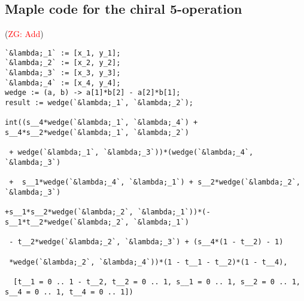 \documentclass[11pt]{amsart}
\theoremstyle{definition}
\theoremstyle{remark}
\numberwithin{equation}{section}
\newcommand{\Gui}[1]{(\textcolor{red}{ZG: #1})}
\begin{document}
\subsection{Maple code for the chiral 5-operation}

\Gui{Add}
\iffalse
\begin{lstlisting}
`&lambda;_1` := [x_1, y_1];
`&lambda;_2` := [x_2, y_2];
`&lambda;_3` := [x_3, y_3];
`&lambda;_4` := [x_4, y_4];
wedge := (a, b) -> a[1]*b[2] - a[2]*b[1];
result := wedge(`&lambda;_1`, `&lambda;_2`);

int((s__4*wedge(`&lambda;_1`, `&lambda;_4`) + s__4*s__2*wedge(`&lambda;_1`, `&lambda;_2`)

 + wedge(`&lambda;_1`, `&lambda;_3`))*(wedge(`&lambda;_4`, `&lambda;_3`)

 +  s__1*wedge(`&lambda;_4`, `&lambda;_1`) + s__2*wedge(`&lambda;_2`, `&lambda;_3`)

+s__1*s__2*wedge(`&lambda;_2`, `&lambda;_1`))*(-s__1*t__2*wedge(`&lambda;_2`, `&lambda;_1`)

 - t__2*wedge(`&lambda;_2`, `&lambda;_3`) + (s__4*(1 - t__2) - 1)

 *wedge(`&lambda;_2`, `&lambda;_4`))*(1 - t__1 - t__2)*(1 - t__4),

  [t__1 = 0 .. 1 - t__2, t__2 = 0 .. 1, s__1 = 0 .. 1, s__2 = 0 .. 1, s__4 = 0 .. 1, t__4 = 0 .. 1])


\end{lstlisting}
\end{document}
